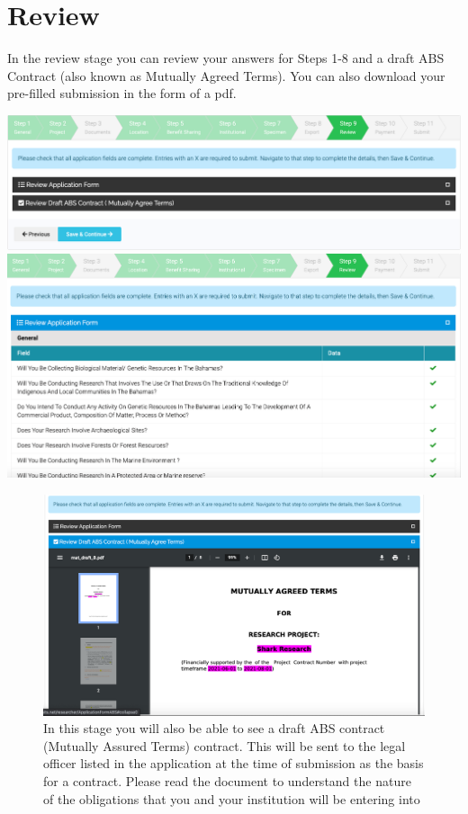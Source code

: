 \documentclass[
]{book}
\begin{document}
\hypertarget{review}{%
\chapter{Review}\label{review}}

In the review stage you can review your answers for Steps 1-8 and a draft ABS Contract (also known as Mutually Agreed Terms). You can also download your pre-filled submission in the form of a pdf.

\includegraphics{images/review.png}
\includegraphics{images/review_application_form.png}

\begin{figure}
\centering
\includegraphics{images/review_mat.png}
\caption{In this stage you will also be able to see a draft ABS contract (Mutually Assured Terms) contract. This will be sent to the legal officer listed in the application at the time of submission as the basis for a contract. Please read the document to understand the nature of the obligations that you and your institution will be entering into}
\end{figure}
\end{document}
